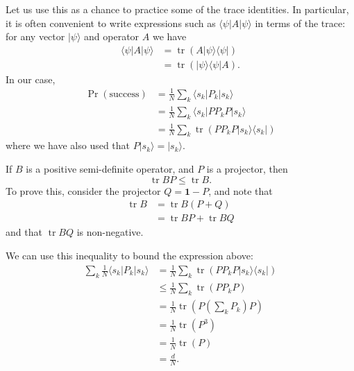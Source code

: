 \documentclass[fleqn,a4paper]{article}
\newenvironment{idea}{\everypar{\setlength{\parindent}{1.5em}}}{}
\theoremstyle{definition}
\theoremstyle{definition}
\theoremstyle{definition}
\theoremstyle{definition}
\theoremstyle{remark}
\begin{document}
Let us use this as a chance to practice some of the trace identities.
In particular, it is often convenient to write expressions such as \(\langle\psi|A|\psi\rangle\) in terms of the trace: for any vector \(|\psi\rangle\) and operator \(A\) we have
\[
  \begin{aligned}
    \langle\psi|A|\psi\rangle
    &= \operatorname{tr}(A|\psi\rangle\langle\psi|)
  \\&= \operatorname{tr}(|\psi\rangle\langle\psi| A).
  \end{aligned}
\]
In our case,
\[
  \begin{aligned}
    \Pr(\text{success})
    &= \frac{1}{N} \sum_k \langle s_k|P_k|s_k\rangle
  \\&= \frac{1}{N} \sum_k \langle s_k|PP_kP|s_k\rangle
  \\&= \frac{1}{N} \sum_k \operatorname{tr}(PP_kP|s_k\rangle\langle s_k|)
  \end{aligned}
\]
where we have also used that \(P|s_k\rangle=|s_k\rangle\).

\begin{idea}
If \(B\) is a positive semi-definite operator, and \(P\) is a projector, then
\[
  \operatorname{tr}BP \leqslant\operatorname{tr}B.
\]
To prove this, consider the projector \(Q=\mathbf{1}-P\), and note that
\[
  \begin{aligned}
    \operatorname{tr}B
    &= \operatorname{tr}B(P+Q)
  \\&= \operatorname{tr}BP + \operatorname{tr}BQ
  \end{aligned}
\]
and that \(\operatorname{tr}BQ\) is non-negative.

\end{idea}

We can use this inequality to bound the expression above:
\[
  \begin{aligned}
    \sum_k\frac{1}{N} \langle s_k|P_k|s_k\rangle
    &= \frac{1}{N} \sum_k \operatorname{tr}(PP_kP|s_k\rangle\langle s_k|)
  \\&\leqslant\frac{1}{N} \sum_k \operatorname{tr}(PP_kP)
  \\&= \frac{1}{N} \operatorname{tr}\left(P\left(\sum_k P_k\right)P\right)
  \\&= \frac{1}{N} \operatorname{tr}(P^3)
  \\&= \frac{1}{N} \operatorname{tr}(P)
  \\&= \frac{d}{N}.
  \end{aligned}
\]
\end{document}
